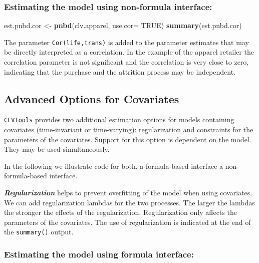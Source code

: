 \documentclass[
]{article}
\newenvironment{Shaded}{\begin{snugshade}}{\end{snugshade}}
\newcommand{\AttributeTok}[1]{\textcolor[rgb]{0.13,0.29,0.53}{#1}}
\newcommand{\ConstantTok}[1]{\textcolor[rgb]{0.56,0.35,0.01}{#1}}
\newcommand{\FunctionTok}[1]{\textcolor[rgb]{0.13,0.29,0.53}{\textbf{#1}}}
\newcommand{\NormalTok}[1]{#1}
\newcommand{\OtherTok}[1]{\textcolor[rgb]{0.56,0.35,0.01}{#1}}
\begin{document}
\subsubsection{\texorpdfstring{\textbf{Estimating the model using
non-formula
interface:}}{Estimating the model using non-formula interface:}}\label{estimating-the-model-using-non-formula-interface-3}

\begin{Shaded}
\begin{Highlighting}[]
\NormalTok{est.pnbd.cor }\OtherTok{\textless{}{-}} \FunctionTok{pnbd}\NormalTok{(clv.apparel, }
                     \AttributeTok{use.cor=} \ConstantTok{TRUE}\NormalTok{)}
\FunctionTok{summary}\NormalTok{(est.pnbd.cor)}
\end{Highlighting}
\end{Shaded}

The parameter \texttt{Cor(life,trans)} is added to the parameter
estimates that may be directly interpreted as a correlation. In the
example of the apparel retailer the correlation parameter is not
significant and the correlation is very close to zero, indicating that
the purchase and the attrition process may be independent.

\subsection{Advanced Options for
Covariates}\label{advanced-options-for-covariates}

\texttt{CLVTools} provides two additional estimation options for models
containing covariates (time-invariant or time-varying): regularization
and constraints for the parameters of the covariates. Support for this
option is dependent on the model. They may be used simultaneously.

In the following we illustrate code for both, a formula-based interface
a non-formula-based interface.

\textbf{\emph{Regularization}} helps to prevent overfitting of the model
when using covariates. We can add regularization lambdas for the two
processes. The larger the lambdas the stronger the effects of the
regularization. Regularization only affects the parameters of the
covariates. The use of regularization is indicated at the end of the
\texttt{summary()} output.

\subsubsection{\texorpdfstring{\textbf{Estimating the model using
formula
interface:}}{Estimating the model using formula interface:}}\label{estimating-the-model-using-formula-interface-4}
\end{document}
